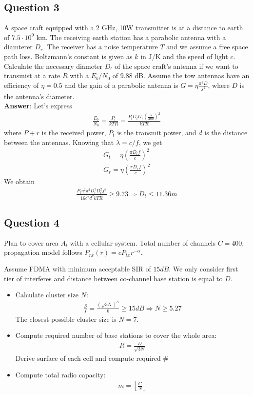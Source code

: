\subsection*{Question 3}
A space craft equipped with a 2 GHz, 10W transmitter is at a distance to earth of $7.5 \cdot 10^9$ km. The receiving earth station has a parabolic antenna with a diamterer $D_r$. The receiver has a noise temperature $T$ and we assume a free space path loss. Boltzmann's constant is given as $k$ in J/K and the speed of light $c$.\\
Calculate the necessary diameter $D_t$ of the space craft's antenna if we want to transmist at a rate $R$ with a $E_b/N_0$ of $9.88$ dB. Assume the tow antennas have an efficiency of $\eta = 0.5$ and the gain of a parabolic antenna is $G = \eta \frac{\pi^2 D}{\lambda^2}$, where $D$ is the antenna's diameter. \\
\textbf{Answer}: Let's express
\begin{align*}
	\frac{E_b}{N_0} = \frac{P_r}{k T R} = \frac{P_t G_t G_r (\frac{\lambda}{4 \pi d})^2}{k T R}
\end{align*}
where $P+r$ is the received power, $P_t$ is the transmit power, and $d$ is the distance between the antennas. Knowing that $\lambda = c / f$, we get
\begin{align*}
	G_t = \eta (\frac{\pi D_t f}{c})^2 \\
	G_r = \eta (\frac{\pi D_r f}{c})^2
\end{align*}
We obtain
\begin{align*}
	\frac{P_t \eta^2 \pi^2 D_r^2 D_t^2 f^2}{16 c^2 d^2 k T R} \geq 9.73 \Rightarrow D_t \leq 11.36m
\end{align*}

\subsection*{Question 4}
Plan to cover area $A_l$ with a cellular system. Total number of channels $C=400$, propagation model follows $P_{rx}(r) = c P_{tx} r^{- \alpha}$. 

Assume FDMA with minimum acceptable SIR of $15dB$. We only consider first tier of interferes and distance between co-channel base station is equal to $D$.

\begin{itemize}
	\item Calculate cluster size $N$:
	\begin{align*}
		\frac{S}{I} = \frac{(\sqrt{3 N})^{\alpha}}{6} \geq 15 dB \Rightarrow N \geq 5.27
	\end{align*}
	The closest possible cluster size is $N=7$.
	\item Compute required number of base stations to cover the whole area:
	\begin{align*}
		R = \frac{D}{\sqrt{3 N}}
	\end{align*}
	Derive surface of each cell and compute required \#
	\item Compute total radio capacity:
	\begin{align*}
		m = \left \lfloor \frac{C}{N} \right \rfloor
	\end{align*}
\end{itemize}


